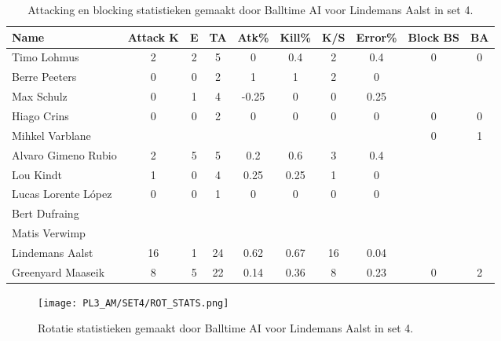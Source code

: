 \begin{table}[ht!]
  \centering
  \scriptsize
  \begin{tabular}{|l|c|c|c|c|c|c|c|c|c|} \hline
    \textbf{Name} & Attack K & E & TA & Atk\% & Kill\% & K/S & Error\% & Block BS & BA \\ \hline
    Timo Lohmus & 2 & 2 & 5 & 0 & 0.4 & 2 & 0.4 & 0 & 0 \\
    Berre Peeters & 0 & 0 & 2 & 1 & 1 & 2 & 0 &   &   \\
    Max Schulz & 0 & 1 & 4 & -0.25 & 0 & 0 & 0.25 &   &   \\
    Hiago Crins & 0 & 0 & 2 & 0 & 0 & 0 & 0 & 0 & 0 \\
    Mihkel Varblane &   &   &   &   &   &   &   & 0 & 1 \\
    Alvaro Gimeno Rubio & 2 & 5 & 5 & 0.2 & 0.6 & 3 & 0.4 &   &   \\
    Lou Kindt & 1 & 0 & 4 & 0.25 & 0.25 & 1 & 0 &   &   \\
    Lucas Lorente López & 0 & 0 & 1 & 0 & 0 & 0 & 0 &   &   \\
    Bert Dufraing &   &   &   &   &   &   &   &   &   \\
    Matis Verwimp &   &   &   &   &   &   &   &   &   \\
    Lindemans Aalst & 16 & 1 & 24 & 0.62 & 0.67 & 16 & 0.04 &   &   \\
    Greenyard Maaseik & 8 & 5 & 22 & 0.14 & 0.36 & 8 & 0.23 & 0 & 2 \\ \hline
  \end{tabular}
  \caption[Attacking en blocking statistieken gemaakt door Balltime AI voor Lindemans Aalst in set 4]{\label{tab:PL3AttBlockAalst4}Attacking en blocking statistieken gemaakt door Balltime AI voor Lindemans Aalst in set 4.}
\end{table}

\begin{figure}
  \centering
  \texttt{[image: PL3\_AM/SET4/ROT\_STATS.png]}
  \caption{\label{fig:PL3_ROT_STATS_4}Rotatie statistieken gemaakt door Balltime AI voor Lindemans Aalst in set 4.}
\end{figure}